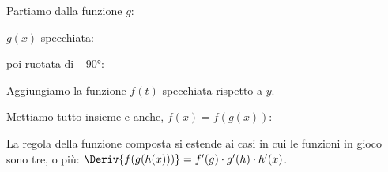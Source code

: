 \noindent\begin{minipage}{.32\textwidth}
\begin{center}
Partiamo dalla funzione \(g\):

\end{center}
\end{minipage}
\begin{minipage}{.32\textwidth}
\begin{center}
\(g(x)\) specchiata:

\disegno[5]{
  \begin{scope}[yscale=-1, red!50!black] \funzioneg \end{scope}
}
\end{center}
\end{minipage}
\begin{minipage}{.32\textwidth}
\begin{center}
poi ruotata di \(-90\text{°}\):

\disegno[5]{
  \begin{scope}[rotate=-90, yscale=-1, red!50!black]
    \funzioneg
  \end{scope}
}
\end{center}
\end{minipage}

\noindent\begin{minipage}{.32\textwidth}
\begin{center}
Aggiungiamo la funzione \(f(t)\) specchiata rispetto a \(y\).

\disegno[5]{
  \begin{scope}[rotate=-90, yscale=-1, red!50!black]
    \funzioneg
  \end{scope}
  \begin{scope}[xscale=-1, blue!50!black]
    \funzioneh
  \end{scope}
}
\end{center}
\end{minipage}
\begin{minipage}{.65\textwidth}
\begin{center}
Mettiamo tutto insieme e anche, \(f(x) = f(g(x))\): \\[.5em]

\derivatacomposta
\end{center}
\end{minipage}

\begin{osservazione}
 La regola della funzione composta si estende ai casi in cui le funzioni 
 in gioco sono tre, o più:
 \(\Deriv{f(g(h(x)))}=f'(g)\cdot g'(h)\cdot h'(x)\).
\end{osservazione}

